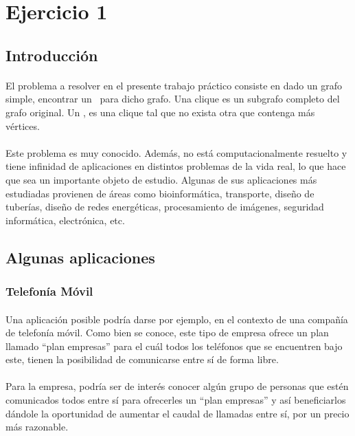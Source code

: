 \section{Ejercicio 1}
\subsection{Introducción}

\paragraph{}
El problema a resolver en el presente trabajo práctico consiste en dado un grafo simple, encontrar un \mc \ para dicho grafo. Una clique es un subgrafo completo del grafo original. Un \mc, es una clique tal que no exista otra que contenga más vértices.

\paragraph{}
Este problema es muy conocido. Además, no está computacionalmente resuelto  y tiene infinidad de aplicaciones en distintos problemas de la vida real, lo que hace que sea un importante objeto de estudio. Algunas de sus aplicaciones más estudiadas provienen de áreas como bioinformática, transporte, diseño de tuberías, diseño de redes energéticas, procesamiento de imágenes, seguridad informática, electrónica, etc.

\subsection{Algunas aplicaciones}

\subsubsection{Telefonía Móvil}
\paragraph{}
Una aplicación posible podría darse por ejemplo, en el contexto de una compañía de telefonía móvil. Como bien se conoce, este tipo de empresa ofrece un plan llamado ``plan empresas'' para el cuál todos los teléfonos que se encuentren bajo este, tienen la posibilidad de comunicarse entre sí de forma libre.

\paragraph{}
Para la empresa, podría ser de interés conocer algún grupo de personas que estén comunicados todos entre sí para ofrecerles un ``plan empresas'' y así beneficiarlos dándole la oportunidad de aumentar el caudal de llamadas entre sí, por un precio más razonable.

